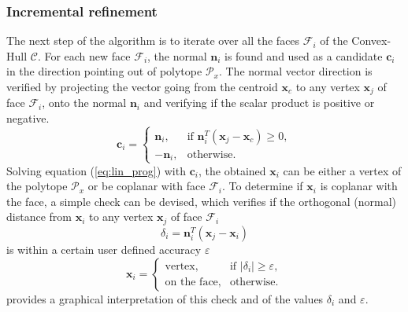 \subsubsection{Incremental refinement} The next step of the algorithm is to iterate over all the faces $\mathcal{F}_i$ of the Convex-Hull $\mathcal{C}$. For each new face $\mathcal{F}_i$, the normal $\bm{n}_i$ is found and used as a candidate $\bm{c}_i$ in the direction pointing out of polytope $\mathcal{P}_x$.
The normal vector direction is verified by projecting the vector going from the centroid $\bm{x}_c$ to any vertex $\bm{x}_{j}$ of face $\mathcal{F}_i$, onto the normal $\bm{n}_i$ and verifying if the scalar product is positive or negative.\\
\begin{equation}
    \bm{c}_i = \begin{cases}
  \bm{n}_i, & \text{if } \bm{n}_i^T(\bm{x}_{j} - \bm{x}_c) \geq 0, \\
  -\bm{n}_i, & \text{otherwise}.
\end{cases} 
\label{eq:normal_condition}
\end{equation}
Solving equation (\ref{eq:lin_prog}) with $\bm{c}_i$, the obtained $\bm{x}_i$ can be either a vertex of the polytope $\mathcal{P}_x$ or be coplanar with face $\mathcal{F}_i$. To determine if  $\bm{x}_i$ is coplanar with the face, a simple check can be devised, which verifies if the orthogonal (normal) distance from $\bm{x}_i$ to any vertex $\bm{x}_{j}$ of face $\mathcal{F}_i$
\begin{equation}
    \delta_i = \bm{n}_i^T(\bm{x}_{j} - \bm{x}_i)
\label{eq:normal_distance}
\end{equation}
is within a certain user defined accuracy $\varepsilon$
\begin{equation}
    \bm{x}_i = \begin{cases}
   \text{vertex}, & \text{if }  |\delta_i| \geq \varepsilon, \\
    \text{on the face}, & \text{otherwise}.
\end{cases} 
\label{eq:normal_coplanar_test}
\end{equation}
 provides a graphical interpretation of this check and of the values $\delta_i$ and $\varepsilon$.

